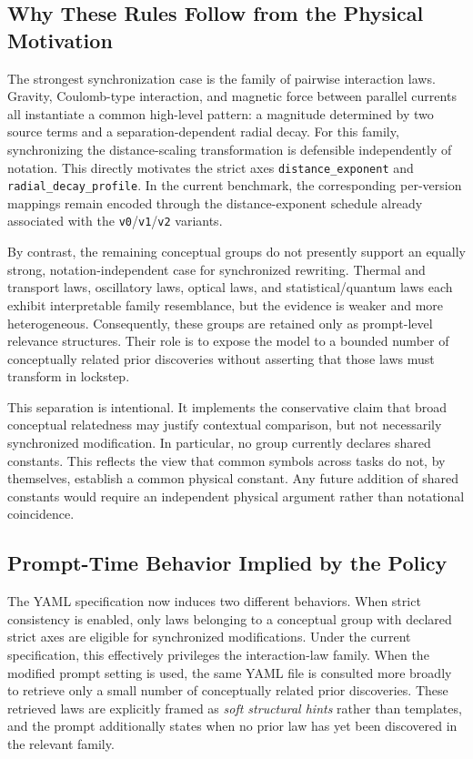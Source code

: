 \subsection{Why These Rules Follow from the Physical Motivation}

The strongest synchronization case is the family of pairwise interaction laws. Gravity, Coulomb-type interaction, and magnetic force between parallel currents all instantiate a common high-level pattern: a magnitude determined by two source terms and a separation-dependent radial decay. For this family, synchronizing the distance-scaling transformation is defensible independently of notation. This directly motivates the strict axes \texttt{distance\_exponent} and \texttt{radial\_decay\_profile}. In the current benchmark, the corresponding per-version mappings remain encoded through the distance-exponent schedule already associated with the \texttt{v0}/\texttt{v1}/\texttt{v2} variants.

By contrast, the remaining conceptual groups do not presently support an equally strong, notation-independent case for synchronized rewriting. Thermal and transport laws, oscillatory laws, optical laws, and statistical/quantum laws each exhibit interpretable family resemblance, but the evidence is weaker and more heterogeneous. Consequently, these groups are retained only as prompt-level relevance structures. Their role is to expose the model to a bounded number of conceptually related prior discoveries without asserting that those laws must transform in lockstep.

This separation is intentional. It implements the conservative claim that broad conceptual relatedness may justify contextual comparison, but not necessarily synchronized modification. In particular, no group currently declares shared constants. This reflects the view that common symbols across tasks do not, by themselves, establish a common physical constant. Any future addition of shared constants would require an independent physical argument rather than notational coincidence.

\subsection{Prompt-Time Behavior Implied by the Policy}

The YAML specification now induces two different behaviors. When strict consistency is enabled, only laws belonging to a conceptual group with declared strict axes are eligible for synchronized modifications. Under the current specification, this effectively privileges the interaction-law family. When the modified prompt setting is used, the same YAML file is consulted more broadly to retrieve only a small number of conceptually related prior discoveries. These retrieved laws are explicitly framed as \emph{soft structural hints} rather than templates, and the prompt additionally states when no prior law has yet been discovered in the relevant family.

